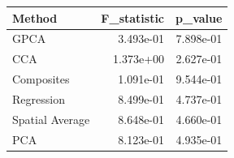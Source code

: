 \begin{tabular}{lrr}
\toprule
Method & F_statistic & p_value \\
\midrule
GPCA & 3.493e-01 & 7.898e-01 \\
CCA & 1.373e+00 & 2.627e-01 \\
Composites & 1.091e-01 & 9.544e-01 \\
Regression & 8.499e-01 & 4.737e-01 \\
Spatial Average & 8.648e-01 & 4.660e-01 \\
PCA & 8.123e-01 & 4.935e-01 \\
\bottomrule
\end{tabular}
